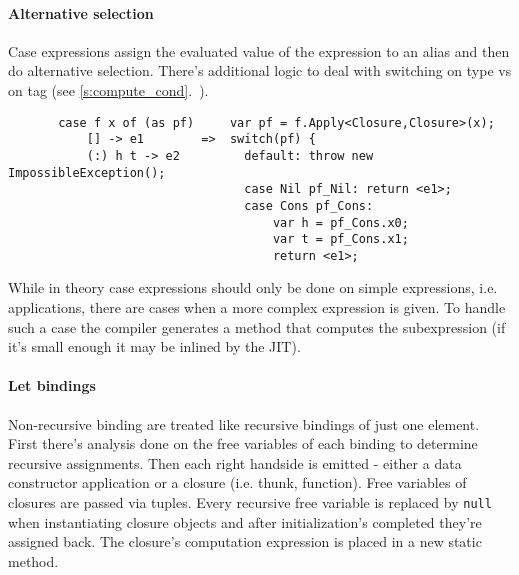 \documentclass[en]{pracamgr}
\newcommand{\myref}[1]{\ref{#1}.~\textit{\nameref{#1}}}
\begin{document}
\paragraph{Alternative selection}
Case expressions assign the evaluated value of the expression to an alias
and then do alternative selection. There's additional logic to deal with
switching on type vs on tag (see \myref{s:compute_cond}).

\begin{center}
\verb|       case f x of (as pf)     var pf = f.Apply<Closure,Closure>(x);      |\\
\verb|           [] -> e1        =>  switch(pf) {                               |\\
\verb|           (:) h t -> e2         default: throw new ImpossibleException();|\\
\verb|                                 case Nil pf_Nil: return <e1>;            |\\
\verb|                                 case Cons pf_Cons:                       |\\
\verb|                                     var h = pf_Cons.x0;                  |\\
\verb|                                     var t = pf_Cons.x1;                  |\\
\verb|                                     return <e1>;                         |\\
\end{center}

While in theory case expressions should only be done on simple expressions,
i.e. applications, there are cases when a more complex expression is given.
To handle such a case the compiler generates a method that computes the subexpression
(if it's small enough it may be inlined by the JIT).

\paragraph{Let bindings}\label{c:let_bindings}
Non-recursive binding are treated like recursive bindings of just one element.
First there's analysis done on the free variables of each binding to determine
recursive assignments. Then each right handside is emitted - either a data constructor
application or a closure (i.e. thunk, function). Free variables of closures are passed via
tuples. Every recursive free variable is replaced by \texttt{null} when instantiating closure objects
and after initialization's completed they're assigned back.
The closure's computation expression is placed in a new static method.
\end{document}

